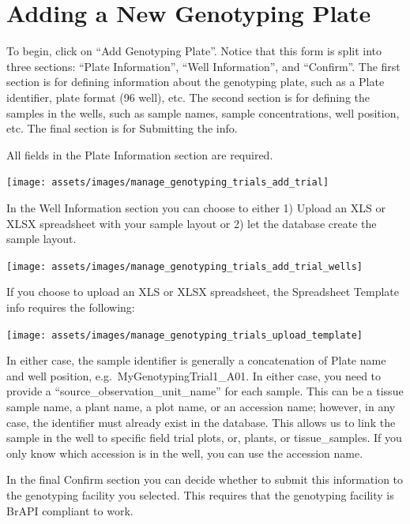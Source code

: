 \documentclass[
  12pt,
]{book}
\begin{document}
\hypertarget{adding-a-new-genotyping-plate}{%
\section{Adding a New Genotyping Plate}\label{adding-a-new-genotyping-plate}}

To begin, click on ``Add Genotyping Plate''. Notice that this form is split into three sections: ``Plate Information'', ``Well Information'', and ``Confirm''. The first section is for defining information about the genotyping plate, such as a Plate identifier, plate format (96 well), etc. The second section is for defining the samples in the wells, such as sample names, sample concentrations, well position, etc. The final section is for Submitting the info.

All fields in the Plate Information section are required.

\begin{center}\texttt{[image: assets/images/manage\_genotyping\_trials\_add\_trial]} \end{center}

In the Well Information section you can choose to either 1) Upload an XLS or XLSX spreadsheet with your sample layout or 2) let the database create the sample layout.

\begin{center}\texttt{[image: assets/images/manage\_genotyping\_trials\_add\_trial\_wells]} \end{center}

If you choose to upload an XLS or XLSX spreadsheet, the Spreadsheet Template info requires the following:

\begin{center}\texttt{[image: assets/images/manage\_genotyping\_trials\_upload\_template]} \end{center}

In either case, the sample identifier is generally a concatenation of Plate name and well position, e.g.~MyGenotypingTrial1\_A01. In either case, you need to provide a ``source\_observation\_unit\_name'' for each sample. This can be a tissue sample name, a plant name, a plot name, or an accession name; however, in any case, the identifier must already exist in the database. This allows us to link the sample in the well to specific field trial plots, or, plants, or tissue\_samples. If you only know which accession is in the well, you can use the accession name.

In the final Confirm section you can decide whether to submit this information to the genotyping facility you selected. This requires that the genotyping facility is BrAPI compliant to work.
\end{document}
